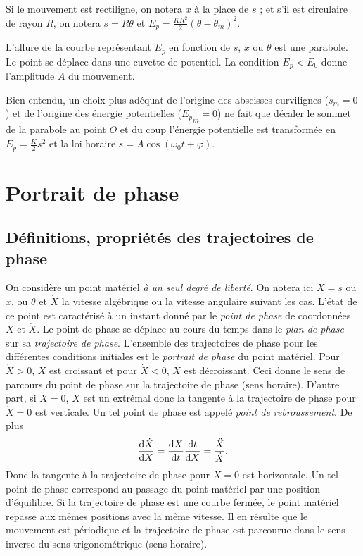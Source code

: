Si le mouvement est rectiligne, on notera \(x\) à la place de \(s\) ; et s'il
est circulaire de rayon \(R\), on notera \(s=R\theta\) et \(E_p =
\frac{KR^2}{2}(\theta-\theta_m)^2\).

L'allure de la courbe représentant \(E_p\) en fonction de \(s\), \(x\) ou
\(\theta\) est une parabole. Le point se déplace dans une cuvette de potentiel.
La condition \(E_p < E_0\) donne l'amplitude \(A\) du mouvement.

Bien entendu, un choix plus adéquat de l'origine des abscisses curvilignes
(\(s_m=0\)) et de l'origine des énergie potentielles (\({E_p}_m=0\)) ne fait
que décaler le sommet de la parabole au point \(O\) et du coup l'énergie
potentielle est transformée en \(E_p = \frac{K}{2}s^2\) et la loi horaire
\(s=A\cos(\omega_0 t +\varphi)\).

\section{Portrait de phase}%
\label{chap5-sec:portratitdephase}%
%
\subsection{Définitions, propriétés des trajectoires de phase}%
\label{chap5-subsec:trajectoiresdephase}%
%
On considère un point matériel \emph{à un seul degré de liberté}. On notera ici
\(X=s\) ou \(x\), ou \(\theta\) et \(\dot{X}\) la vitesse algébrique ou la
vitesse angulaire suivant les cas. L'état de ce point est caractérisé à un
instant donné par le \emph{point de phase} de coordonnées \(X\) et \(\dot{X}\).
Le point de phase se déplace au cours du temps dans le \emph{plan de phase} sur
sa \emph{trajectoire de phase}. L'ensemble des trajectoires de phase pour les
différentes conditions initiales est le \emph{portrait de phase} du point
matériel. Pour \(\dot{X}>0\), \(X\) est croissant et pour \(\dot{X}<0\), \(X\)
est décroissant. Ceci donne le sens de parcours du point de phase sur la
trajectoire de phase (sens horaire). D'autre part, si \(\dot{X}=0\), \(X\) est
un extrémal donc la tangente à la trajectoire de phase pour \(\dot{X}=0\) est
verticale. Un tel point de phase est appelé \emph{point de rebroussement}. De
plus
\begin{equation}%
  \derived{\dot{X}}{X} = \derived{X}{t} \derived{t}{X} =
  \frac{\ddot{X}}{\dot{X}}.
\end{equation}%
Donc la tangente à la trajectoire de phase pour \(\dot{X}=0\) est horizontale.
Un tel point de phase correspond au passage du point matériel par une position
d'équilibre. Si la trajectoire de phase est une courbe fermée, le point
matériel repasse aux mêmes positions avec la même vitesse. Il en résulte que le
mouvement est périodique et la trajectoire de phase est parcourue dans le sens
inverse du sens trigonométrique (sens horaire).
%
